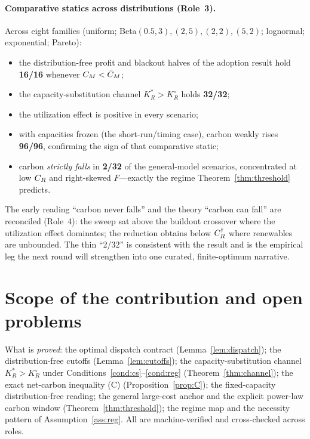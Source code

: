 \documentclass[11pt,reqno]{amsart}
\theoremstyle{plain}
\theoremstyle{definition}\newtheorem{condition}{Condition}\newtheorem{assumption}{Assumption}
\theoremstyle{remark}\newtheorem{remark}{Remark}
\newcommand{\KR}{K_R}\newcommand{\KF}{K_F}\newcommand{\KM}{K_M}
\newcommand{\KRs}{K_R^{*}}\newcommand{\KFs}{K_F^{*}}\newcommand{\KMs}{K_M^{*}}
\newcommand{\KRo}{K_R^{\circ}}\newcommand{\KFo}{K_F^{\circ}}
\newcommand{\CMbar}{\bar C_M}\newcommand{\bp}{\beta+p}\newcommand{\FKR}{F_{\!\KR}}
\begin{document}
\paragraph{Comparative statics across distributions (Role~3).} Across eight
families (uniform; Beta$(0.5,3),(2,5),(2,2),(5,2)$; lognormal; exponential;
Pareto):
\begin{itemize}[leftmargin=1.5em,topsep=2pt,itemsep=1pt]
  \item the distribution-free profit and blackout halves of the adoption result
        hold \textbf{16/16} whenever $\CM<\CMbar$;
  \item the capacity-substitution channel $\KRs>\KRo$ holds \textbf{32/32};
  \item the utilization effect is positive in every scenario;
  \item with capacities frozen (the short-run/timing case), carbon weakly rises
        \textbf{96/96}, confirming the sign of that comparative static;
  \item carbon \emph{strictly falls} in \textbf{2/32} of the general-model
        scenarios, concentrated at low $C_R$ and right-skewed $F$---exactly the
        regime Theorem~\ref{thm:threshold} predicts.
\end{itemize}
The early reading ``carbon never falls'' and the theory ``carbon can fall'' are
reconciled (Role~4): the sweep sat above the buildout crossover where the
utilization effect dominates; the reduction obtains below $C_R^{\dagger}$ where
renewables are unbounded. The thin ``2/32'' is consistent with the result and is
the empirical leg the next round will strengthen into one curated, finite-optimum
narrative.

\section{Scope of the contribution and open problems}\label{sec:open}

What is \emph{proved}: the optimal dispatch contract (Lemma~\ref{lem:dispatch});
the distribution-free cutoffs (Lemma~\ref{lem:cutoffs}); the capacity-substitution
channel $\KRs>\KRo$ under Conditions~\ref{cond:cs}--\ref{cond:reg}
(Theorem~\ref{thm:channel}); the exact net-carbon inequality (C)
(Proposition~\ref{prop:C}); the fixed-capacity distribution-free reading; the
general large-cost anchor and the explicit power-law carbon window
(Theorem~\ref{thm:threshold}); the regime map and the necessity pattern of
Assumption~\ref{ass:reg}. All are machine-verified and cross-checked across roles.
\end{document}
